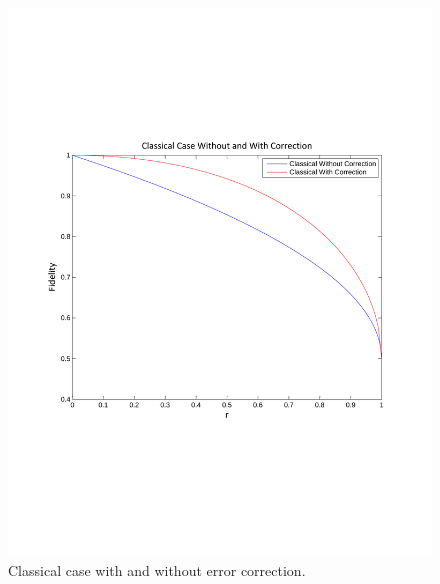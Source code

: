 \documentclass[prl,onecolumn]{revtex4-1}
\begin{document}
\begin{figure}[!h]
\begin{center}
\includegraphics[width=\columnwidth]{Classical.pdf}
\end{center}
\setlength{\abovecaptionskip}{-0.35cm}
\caption{\footnotesize{Classical case with and without error correction.}}\label{classical}
\end{figure}

\begin{thebibliography}{99}

\end{thebibliography}
\end{document}
